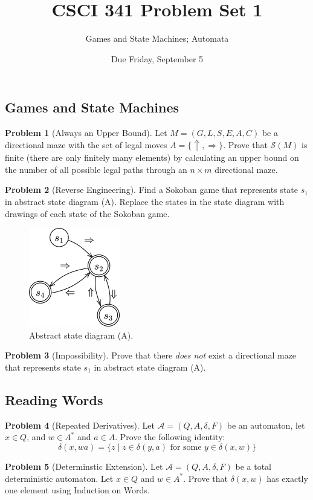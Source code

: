 \documentclass[11pt]{article}
\title{CSCI 341 Problem Set 1}
\author{Games and State Machines; Automata}
\date{Due
    Friday, September 5
}
\theoremstyle{theorem} %
\theoremstyle{definition} %
\newtheorem{problem}                    {{\color{BurntOrange}Problem}}
\theoremstyle{remark} %
\begin{document}
\maketitle

\subsection*{Games and State Machines}

\begin{problem}
    [Always an Upper Bound]
    Let \(M = (G, L, S, E, A, C)\) be a directional maze with the set of legal moves \(A = \{\Uparrow, \Rightarrow\}\).
    Prove that \(\mathcal S(M)\) is finite (there are only finitely many elements) by calculating an upper bound on the number of all possible legal paths through an \(n\times m\) directional maze.
\end{problem}

\begin{problem}
    [Reverse Engineering]
    Find a Sokoban game that represents state \(s_1\) in abstract state diagram (A).
    Replace the states in the state diagram with drawings of each state of the Sokoban game.

    \begin{figure}[h]
        \centering
        \includegraphics{../imgs/reverseengineering.png}
        \caption{Abstract state diagram (A).}
    \end{figure}
\end{problem}

\begin{problem}
    [Impossibility]
    Prove that there \emph{does not} exist a directional maze that represents state \(s_1\) in abstract state diagram (A).
\end{problem}

\subsection*{Reading Words}

\begin{problem}
    [Repeated Derivatives]
    Let \(\mathcal A = (Q, A, \delta, F)\) be an automaton, let \(x \in Q\), and \(w \in A^*\) and \(a \in A\).
    Prove the following identity:
    \[
        \delta(x, w a) = \{z \mid z \in \delta(y, a) \text{ for some } y \in \delta(x, w)\}
    \]
\end{problem}

\begin{problem}
    [Determinstic Extension]
    Let \(\mathcal A = (Q, A, \delta, F)\) be a total deterministic automaton.
    Let \(x \in Q\) and \(w \in A^*\).
    Prove that \(\delta(x, w)\) has exactly one element using Induction on Words.
\end{problem}
\end{document}
